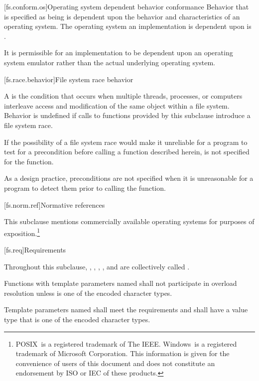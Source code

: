 [fs.conform.os]{Operating system dependent behavior conformance}
\pnum
Behavior that is specified as being
is dependent upon the behavior
and characteristics of an operating system.
The operating system an
implementation is dependent upon is
.

\pnum
It is permissible for an implementation to be dependent upon an operating
system emulator rather than the actual underlying operating system.

[fs.race.behavior]{File system race behavior}

\pnum
A  is
the condition that occurs
when multiple threads, processes, or computers interleave access and
modification of
the same object within a file system.
Behavior is undefined if calls to functions provided by this subclause introduce a file system race.

\pnum
If the possibility of a file system race would make it unreliable for a
program to test for a precondition before calling a function described herein,
{}\expects is not specified for the function.
\begin{note}
As a design practice, preconditions are not specified when it
is unreasonable for a program to detect them prior to calling the function.
\end{note}

[fs.norm.ref]{Normative references}

\pnum
This subclause mentions commercially
available operating systems for purposes of exposition.\footnote{
POSIX\textregistered\ is a registered trademark of The IEEE\@.
Windows\textregistered\ is a registered trademark of Microsoft Corporation.
This information is given for the convenience of users of this document and
does not constitute an endorsement by ISO or IEC of these
products.
}

[fs.req]{Requirements}

\pnum
Throughout this subclause, , , ,
, and  are collectively called
.

\pnum
Functions with template parameters named 
shall not participate in overload resolution
unless  is one of the encoded character types.

\pnum
Template parameters named  shall meet the
 requirements and shall
have a value type that is one of the encoded character types.

